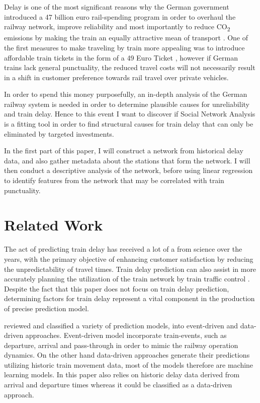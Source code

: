 \documentclass[12pt,a4paper]{article}
\begin{document}
Delay is one of the most significant reasons why the German government introduced a 47 billion euro rail-spending program in order to overhaul the railway network, improve reliability and most importantly to reduce CO\textsubscript{2} emissions by making the train an equally attractive mean of transport \citep{Scally2023}. 
One of the first measures to make traveling by train more appealing was to introduce affordable train tickets in the form of a 49 Euro Ticket \citep{DW2023}, however if German trains lack general punctuality, the reduced travel costs will not necessarily result in a shift in customer preference towards rail travel over private vehicles.

In order to spend this money purposefully, an in-depth analysis of the German railway system is needed in order to determine plausible causes for unreliability and train delay. 
Hence to this event I want to discover if Social Network Analysis is a fitting tool in order to find structural causes for train delay that can only be eliminated by targeted investments. 

In the first part of this paper, I will construct a network from historical delay data, and also gather metadata about the stations that form the network. 
I will then conduct a descriptive analysis of the network, before using linear regression to identify features from the network that may be correlated with train punctuality.

\maketitle
\section{\label{sec:Related Work}Related Work}

The act of predicting train delay has received a lot of a from science over the years, with the primary objective of enhancing customer satisfaction by reducing the unpredictability of travel times. 
Train delay prediction can also assist in more accurately planning the utilization of the train network by train traffic control \citep{Spanninger2022}. 
Despite the fact that this paper does not focus on train delay prediction, determining factors for train delay represent a vital component in the production of precise prediction model.

\cite{Spanninger2022} reviewed and classified a variety of prediction models, into event-driven and data-driven approaches. 
Event-driven model incorporate train-events, such as departure, arrival and pass-through in order to mimic the railway operation dynamics. 
On the other hand data-driven approaches generate their predictions utilizing historic train movement data, most of the models therefore are machine learning models. 
In this paper also relies on historic delay data derived from arrival and departure times whereas it could be classified as a data-driven approach. 
\end{document}
